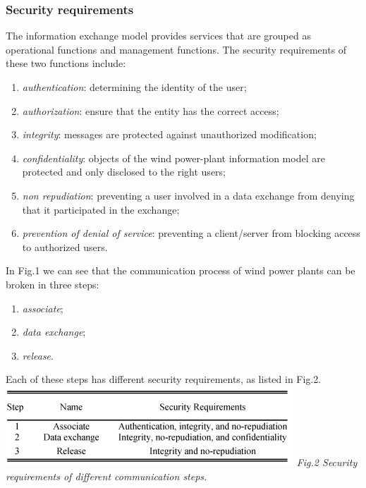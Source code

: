 \documentclass[twosided,a4,10pt]{article}
\begin{document}
\begin{multicols}{2}
  	\subsubsection{Security requirements}
  	The information exchange model provides services that are grouped as operational functions and management functions. The security requirements of these two functions include:
  	\begin{enumerate}
  		\item \textit{authentication}: determining the identity of the user;
  		\item \textit{authorization}: ensure that the entity has the correct access;
  		\item \textit{integrity}: messages are protected against unauthorized modification;
  		\item \textit{confidentiality}: objects of the wind power-plant information model are protected and only disclosed to the right users;
  		\item \textit{non repudiation}: preventing a user involved in a data exchange from denying that it participated in the exchange;
  		\item \textit{prevention of denial of service}: preventing a client/server from blocking access to authorized users.
  	\end{enumerate}	
  	In Fig.1 we can see that the communication process of wind power plants can be broken in three steps:
  	\begin{enumerate}
  		\item \textit{associate};
  		\item \textit{data exchange};
  		\item \textit{release}.
  	\end{enumerate}
  	Each of these steps has different security requirements, as listed in Fig.2.	
  	\includegraphics[scale=0.65]{securityRequirements.png}
  	\textit{Fig.2 Security requirements of different communication steps.} \newline	

\end{multicols}
\end{document}
